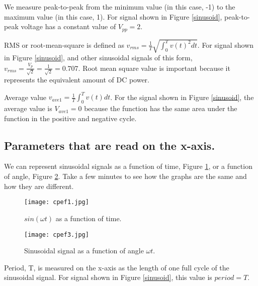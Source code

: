 \documentclass{ximera}
\begin{document}
\begin{definition}
We measure peak-to-peak from the minimum value  (in this case, -1) to the maximum value (in this case, 1).  For signal shown in Figure \ref{sinusoid}, peak-to-peak voltage has a constant value of  $V_{pp}=2$.
\end{definition}

\begin{definition}
RMS or root-mean-square is defined as $v_{rms}=\frac{1}{T} \sqrt{\int_0^T v(t)^2 dt}$. For signal shown in Figure \ref{sinusoid}, and other sinusoidal signals of this form,  $v_{rms}=\frac{V_p}{\sqrt{2}}=\frac{1}{\sqrt{2}}=0.707$. Root mean square value is important because it represents the equivalent amount of DC power.
\end{definition}


\begin{definition}
Average value $v_{ave1}=\frac{1}{T} \int_0^T v(t) dt$. For the signal shown in Figure \ref{sinusoid}, the average value is $V_{ave1}=0$ because the function has the same area under the function in the positive and negative cycle. 
\end{definition}

\subsection{Parameters that are read on the x-axis.}

\begin{definition}
We can represent sinusoidal signals as a function of time, Figure \ref{sin}, or a function of angle, Figure \ref{sinPh}. Take a few minutes to see how the graphs are the same and how they are different.



\begin{figure}[htpb]
\texttt{[image: cpef1.jpg]}
\caption{$sin ( \omega t)$ as a function of time.} \label{sin}
\end{figure}




\begin{figure}[htpb]
\texttt{[image: cpef3.jpg]}
\caption{Sinusoidal signal as a function of angle $\omega t$.}
\label{sinPh}
\end{figure}

\end{definition}


\begin{definition}
Period, T, is measured on the x-axis as the length of one full cycle of the sinusoidal signal. For signal shown in Figure \ref{sinusoid}, this value is $period=T$. 
\end{definition}
\end{document}
